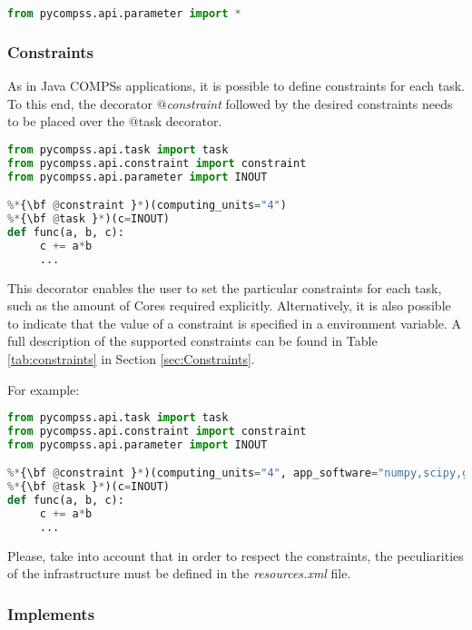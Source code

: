 \begin{lstlisting}[language=python]
from pycompss.api.parameter import *
\end{lstlisting}

\subsubsection{Constraints}
\label{subsubsec:constraints}

As in Java COMPSs applications, it is possible to define constraints for each task.
To this end, the decorator {\it $@$constraint} followed by the desired constraints needs to be placed over the $@$task decorator.

\begin{lstlisting}[language=python]
from pycompss.api.task import task
from pycompss.api.constraint import constraint
from pycompss.api.parameter import INOUT

%*{\bf @constraint }*)(computing_units="4")
%*{\bf @task }*)(c=INOUT)
def func(a, b, c):
     c += a*b
     ...
\end{lstlisting}

This decorator enables the user to set the particular constraints for each task, such as the amount of Cores required explicitly.
Alternatively, it is also possible to indicate that the value of a constraint is specified in a environment variable.
A full description of the supported constraints can be found in Table \ref{tab:constraints} in Section \ref{sec:Constraints}.

For example:

\begin{lstlisting}[language=python]
from pycompss.api.task import task
from pycompss.api.constraint import constraint
from pycompss.api.parameter import INOUT

%*{\bf @constraint }*)(computing_units="4", app_software="numpy,scipy,gnuplot", memory_size="$MIN_MEM_REQ")
%*{\bf @task }*)(c=INOUT)
def func(a, b, c):
     c += a*b
     ...
\end{lstlisting}

Please, take into account that in order to respect the constraints, the peculiarities of the infrastructure must be defined in the {\it resources.xml} file.


\subsubsection{Implements}

